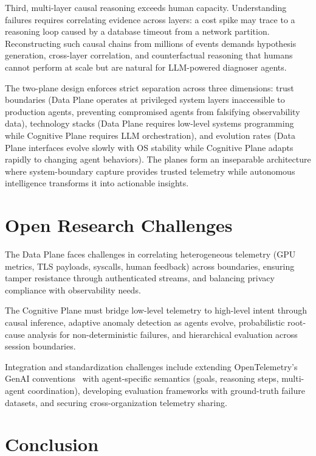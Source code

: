 \documentclass[sigplan,screen,9pt]{acmart}
\begin{document}
Third, multi-layer causal reasoning exceeds human capacity. Understanding failures requires correlating evidence across layers: a cost spike may trace to a reasoning loop caused by a database timeout from a network partition. Reconstructing such causal chains from millions of events demands hypothesis generation, cross-layer correlation, and counterfactual reasoning that humans cannot perform at scale but are natural for LLM-powered diagnoser agents.

The two-plane design enforces strict separation across three dimensions: trust boundaries (Data Plane operates at privileged system layers inaccessible to production agents, preventing compromised agents from falsifying observability data), technology stacks (Data Plane requires low-level systems programming while Cognitive Plane requires LLM orchestration), and evolution rates (Data Plane interfaces evolve slowly with OS stability while Cognitive Plane adapts rapidly to changing agent behaviors). The planes form an inseparable architecture where system-boundary capture provides trusted telemetry while autonomous intelligence transforms it into actionable insights.

\section{Open Research Challenges}

The Data Plane faces challenges in correlating heterogeneous telemetry (GPU metrics, TLS payloads, syscalls, human feedback) across boundaries, ensuring tamper resistance through authenticated streams, and balancing privacy compliance with observability needs.

The Cognitive Plane must bridge low-level telemetry to high-level intent through causal inference, adaptive anomaly detection as agents evolve, probabilistic root-cause analysis for non-deterministic failures, and hierarchical evaluation across session boundaries.

Integration and standardization challenges include extending OpenTelemetry's GenAI conventions~\cite{otelgenai,semconv} with agent-specific semantics (goals, reasoning steps, multi-agent coordination), developing evaluation frameworks with ground-truth failure datasets, and securing cross-organization telemetry sharing.

\section{Conclusion}
\end{document}
